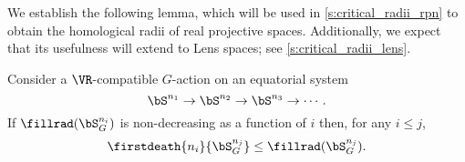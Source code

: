 \subsubsection{}\label{ss:fundamental_lemma}

We establish the following lemma, which will be used in \cref{s:critical_radii_rpn} to obtain the homological radii of real projective spaces.
Additionally, we expect that its usefulness will extend to Lens spaces; see \cref{s:critical_radii_lens}.

\lemma Consider a $\VR$-compatible \(G\)-action on an equatorial system
\[
\bS^{n_1} \to \bS^{n_2} \to \bS^{n_3} \to \dotsb .
\]
If $\fillrad(\bS^{n_i}_G)$ is non-decreasing as a function of \(i\) then, for any \(i \leq j\),
\[
\firstdeath{n_i}{\bS^{n_j}_G} \leq \fillrad(\bS^{n_j}_G).
\]

